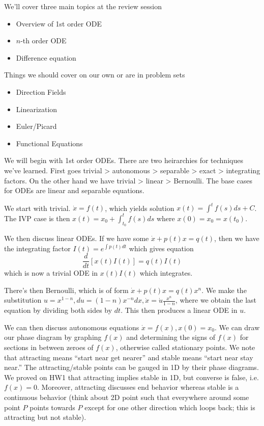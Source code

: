 \documentclass[10pt]{article}
\newcommand{\rd}[2]{\frac{d#1}{d#2}}
\begin{document}

We'll cover three main topics at the review session
\begin{itemize}
	\item Overview of 1st order ODE
	\item $n$-th order ODE
	\item Difference equation
\end{itemize}

Things we should cover on our own or are in problem sets
\begin{itemize}
	\item Direction Fields
	\item Linearization
	\item Euler/Picard
	\item Functional Equations
\end{itemize}

We will begin with 1st order ODEs. There are two heirarchies for techniques we've learned. First goes trivial > autonomous > separable > exact > integrating factors. On the other hand we have trivial > linear > Bernoulli. The base cases for ODEs are linear and separable equations.

We start with trivial. $\dot{x} = f(t)$, which yields solution $x(t) = \int^t f(s) ds + C$. The IVP case is then $x(t) = x_0 + \int_{t_0}^t f(s) ds$ where $x(0) = x_0 = x(t_0)$.

We then discuss linear ODEs. If we have some $\dot{x} + p(t)x = q(t)$, then we have the integrating factor $I(t) = e^{\int p(t) dt}$ which gives equation
$$\rd{}{t} \left[ x(t)I(t) \right] = q(t)I(t)$$
which is now a trivial ODE in $x(t)I(t)$ which integrates.

There's then Bernoulli, which is of form $\dot{x} + p(t)x = q(t) x^{n}$. We make the substitution $u=x^{1-n}, du = (1-n)x^{-n}dx, \dot{x} = \dot{u}\frac{x^n}{1-n}$, where we obtain the last equation by dividing both sides by $dt$. This then produces a linear ODE in $u$. 

We can then discuss autonomous equations $\dot{x} = f(x), x(0) = x_0$. We can draw our phase diagram by graphing $f(x)$ and determining the signs of $f(x)$ for sections in between zeroes of $f(x)$, otherwise called stationary points. We note that attracting means ``start near get nearer'' and stable means ``start near stay near.'' The attracting/stable points can be gauged in 1D by their phase diagrams. We proved on HW1 that attracting implies stable in 1D, but converse is false, i.e. $f(x) = 0$. Moreover, attracting discusses end behavior whereas stable is a continuous behavior (think about 2D point such that everywhere around some point $P$ points towards $P$ except for one other direction which loops back; this is attracting but not stable).
\end{document}

